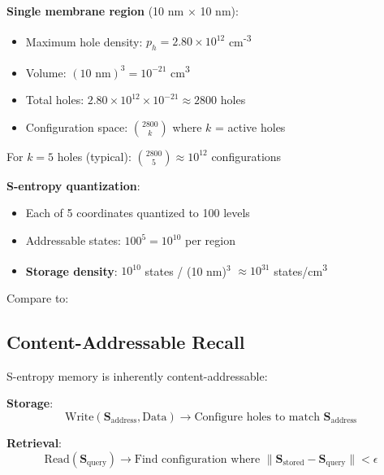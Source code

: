 \documentclass[11pt,a4paper]{article}
\begin{document}
\textbf{Single membrane region} (10 nm × 10 nm):
\begin{itemize}
\item Maximum hole density: $p_h = 2.80\times10^{12}$ cm\textsuperscript{-3}
\item Volume: $(10 \text{ nm})^3 = 10^{-21}$ cm\textsuperscript{3}
\item Total holes: $2.80\times10^{12} \times 10^{-21} \approx 2800$ holes
\item Configuration space: $\binom{2800}{k}$ where $k$ = active holes
\end{itemize}

For $k=5$ holes (typical): $\binom{2800}{5} \approx 10^{12}$ configurations

\textbf{S-entropy quantization}:
\begin{itemize}
\item Each of 5 coordinates quantized to 100 levels
\item Addressable states: $100^5 = 10^{10}$ per region
\item \textbf{Storage density}: $10^{10}$ states / (10 nm)$^3$ $\approx 10^{31}$ states/cm\textsuperscript{3}
\end{itemize}

Compare to:

\subsection{Content-Addressable Recall}

S-entropy memory is inherently content-addressable:

\textbf{Storage}:
\begin{equation}
\text{Write}(\mathbf{S}_{\text{address}}, \text{Data}) \rightarrow \text{Configure holes to match } \mathbf{S}_{\text{address}}
\end{equation}

\textbf{Retrieval}:
\begin{equation}
\text{Read}(\mathbf{S}_{\text{query}}) \rightarrow \text{Find configuration where } \|\mathbf{S}_{\text{stored}} - \mathbf{S}_{\text{query}}\| < \epsilon
\end{equation}
\end{document}
